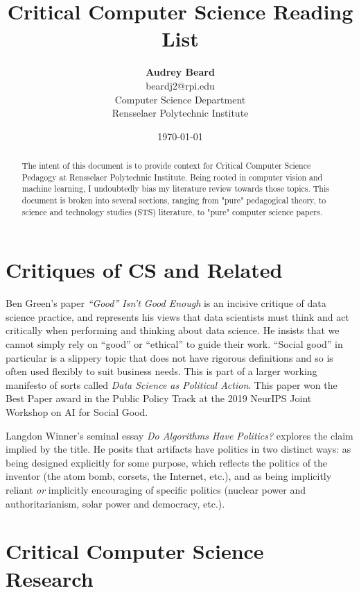 \documentclass{article}
\title{Critical Computer Science Reading List}
\author{\textbf{Audrey Beard} \\
        beardj2@rpi.edu \\
        Computer Science Department \\
        Rensselaer Polytechnic Institute}
\date{\today}
\begin{document}
\maketitle

\begin{abstract}
    The intent of this document is to provide context for Critical Computer Science Pedagogy at Rensselaer Polytechnic Institute.
    Being rooted in computer vision and machine learning, I undoubtedly bias my literature review towards those topics.
    This document is broken into several sections, ranging from "pure" pedagogical theory, to science and technology studies (STS) literature, to "pure" computer science papers.
\end{abstract}
    
\section{Critiques of CS and Related}
    Ben Green's paper \textit{``Good'' Isn't Good Enough}\cite{greenGoodIsnGood2019} is an incisive critique of data science practice, and represents his views that data scientists must think and act critically when performing and thinking about data science.
    He insists that we cannot simply rely on ``good'' or ``ethical'' to guide their work. ``Social good'' in particular is a slippery topic that does not have rigorous definitions and so is often used flexibly to suit business needs.
    This is part of a larger working manifesto of sorts called \textit{Data Science as Political Action}\cite{greenDataSciencePolitical2019}.
    This paper won the Best Paper award in the Public Policy Track at the 2019 NeurIPS Joint Workshop on AI for Social Good.
    
    Langdon Winner's seminal essay \textit{Do Algorithms Have Politics?}\cite{winnerArtifactsHavePolitics1980} explores the claim implied by the title. He posits that artifacts have politics in two distinct ways: as being designed explicitly for some purpose, which reflects the politics of the inventor (the atom bomb, corsets, the Internet, etc.), and as being implicitly reliant \textit{or} implicitly encouraging of specific politics (nuclear power and authoritarianism, solar power and democracy, etc.).

\section{Critical Computer Science Research}
    
\end{document}
